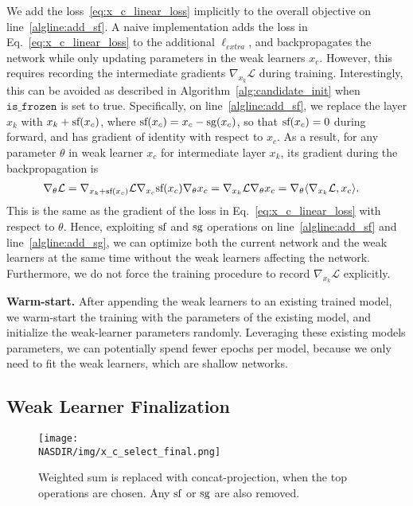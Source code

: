 We add the loss~\ref{eq:x_c_linear_loss} implicitly to the overall
objective on line~\ref{algline:add_sf}.  A naive implementation adds
the loss in Eq.~\ref{eq:x_c_linear_loss} to the additional
$\ell_{extra}$, and backpropagates the network while only updating
parameters in the weak learners $x_c$.  However, this requires recording the intermediate gradients $\nabla _{x_{k}} \mathcal{L}$
during training.  Interestingly, this can be avoided as described in Algorithm~\ref{alg:candidate_init} when
$\texttt{is\_frozen}$ is set to true.  Specifically, on
line~\ref{algline:add_sf}, we replace the layer $x_k$ with $x_k +
\textrm{sf}(x_c)$, where $\textrm{sf}(x_c) = x_c -
\textrm{sg}(x_c)$, so that $\textrm{sf}(x_c) = 0$ during forward,
and has gradient of identity with respect to $x_c$. As a result, for
any parameter $\theta$ in weak learner $x_c$ for intermediate layer
$x_k$, its gradient during the backpropagation is
\begin{align}
\nabla_{\theta} \mathcal{L} &= \nabla _{x_k + \textrm{sf}(x_c)} \mathcal{L} \nabla _{x_c} \textrm{sf}(x_c) \nabla _{\theta} x_c = \nabla _{x_k}\mathcal{L} \nabla _{\theta} x_c = \nabla_{\theta} \langle \nabla_{x_{k}} \mathcal{L}, x_c \rangle.
\end{align}
This is the same as the gradient of the loss in Eq.~\ref{eq:x_c_linear_loss} with respect to $\theta$.
Hence, exploiting $\textrm{sf}$ and $\textrm{sg}$ operations on line~\ref{algline:add_sf} and line~\ref{algline:add_sg}, we can
optimize both the current network and the weak learners at the same time without the weak learners affecting the network. Furthermore, 
we do not force the training procedure to record $\nabla_{x_k} \mathcal{L}$ explicitly. 

\textbf{Warm-start.} After appending the weak learners to an existing trained model, we warm-start the training with the parameters
of the existing model, and initialize the weak-learner parameters randomly. Leveraging these existing models parameters, 
we can potentially spend fewer epochs per model, because we only need to fit the weak learners, which are
shallow networks.


\subsection{Weak Learner Finalization}
\label{sec:candidate_finalize}

\begin{figure}[t]
\centering
    \texttt{[image: \\NASDIR/img/x\_c\_select\_final.png]}
    \caption{Weighted sum is replaced with concat-projection, when the top operations are chosen. Any $\textrm{sf}$ or $\textrm{sg}$ are also removed.}
    \label{fig:x_c_select_final}
\end{figure}

